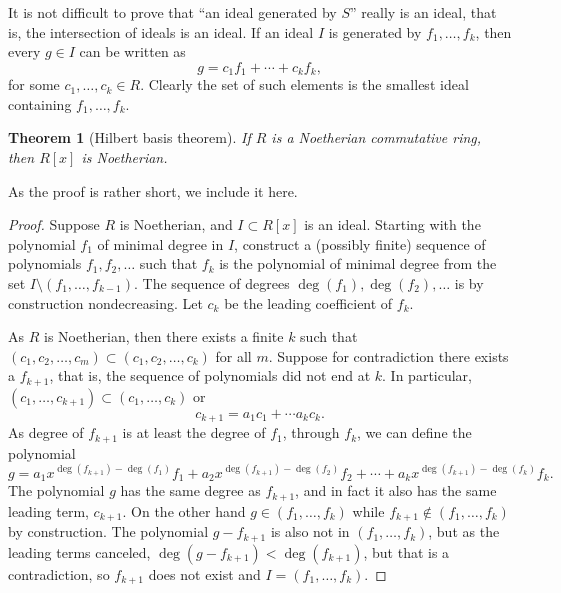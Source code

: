 \documentclass[12pt,openany]{book}
\theoremstyle{plain}
\newtheorem{thm}{Theorem}[section]
\theoremstyle{remark}
\theoremstyle{definition}
\theoremstyle{exercise}
\theoremstyle{example}
\begin{document}
It is not difficult to prove that ``an ideal generated by $S$'' really is
an ideal, that is, the intersection of ideals is an ideal.
If an ideal $I$ is generated by $f_1,\ldots,f_k$, then every
$g \in I$ can be written as
\begin{equation*}
g = c_1 f_1 + \cdots + c_k f_k,
\end{equation*}
for some $c_1,\ldots,c_k \in R$.  Clearly the set of such elements is
the smallest ideal containing $f_1,\ldots,f_k$.

\begin{thm}[Hilbert basis theorem] \label{thm:hilbertbasis}
%
If $R$ is a Noetherian commutative ring, then $R[x]$ is Noetherian.
\end{thm}

As the proof is rather short, we include it here.

\begin{proof}
Suppose $R$ is Noetherian, and
$I \subset R[x]$ is an ideal.
Starting with the polynomial $f_1$ of minimal degree in $I$,
construct a (possibly finite) sequence of polynomials $f_1,f_2,\ldots$
such that $f_k$ is the polynomial of minimal degree
from the set $I \setminus (f_1,\ldots,f_{k-1})$.
The sequence of degrees $\deg(f_1),\deg(f_2),\ldots$ is by construction
nondecreasing.
Let $c_k$ be the leading coefficient of $f_k$.

As $R$ is Noetherian, then there exists a finite $k$ such
that $(c_1,c_2,\ldots,c_m) \subset (c_1,c_2,\ldots,c_k)$ for all $m$.
Suppose for contradiction there exists a $f_{k+1}$, that is, the sequence
of polynomials
did not end at $k$.  In particular,
$(c_1,\ldots,c_{k+1}) \subset (c_1,\ldots,c_k)$ or
\begin{equation*}
c_{k+1} = a_1 c_1 + \cdots a_k c_k .
\end{equation*}
As degree of $f_{k+1}$ is at least the degree of $f_1$, through $f_k$,
we can define the polynomial
\begin{equation*}
g =
a_1 x^{\deg(f_{k+1})-\deg(f_1)} f_1
+
a_2 x^{\deg(f_{k+1})-\deg(f_2)} f_2
+
\cdots
+
a_k x^{\deg(f_{k+1})-\deg(f_k)} f_k .
\end{equation*}
The polynomial $g$ has the same degree as $f_{k+1}$,
and in fact it also has the same leading term,
$c_{k+1}$.  On the other hand $g \in (f_1,\ldots,f_{k})$ while
$f_{k+1} \notin (f_1,\ldots,f_k)$ by construction.  The polynomial
$g-f_{k+1}$ is also not in
$(f_1,\ldots,f_k)$, but as the leading terms canceled,
$\deg(g-f_{k+1}) < \deg(f_{k+1})$, but that is a contradiction, so $f_{k+1}$
does not exist and
$I = (f_1,\ldots,f_k)$.
\end{proof}
\end{document}
